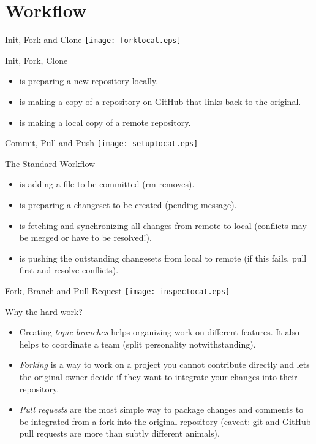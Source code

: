 \documentclass[style=husky,display=slides,clock]{powerdot}
\begin{document}
\section{Workflow}
\begin{slide}{Init, Fork and Clone}
	\texttt{[image: forktocat.eps]}
\end{slide}
\begin{note}{Init, Fork, Clone}
	\begin{itemize}
		\item[Init] is preparing a new repository locally.
		\item[Fork] is making a copy of a repository on GitHub that links back to the original.
		\item[Clone] is making a local copy of a remote repository.
	\end{itemize}
\end{note}
\begin{slide}{Commit, Pull and Push}
	\texttt{[image: setuptocat.eps]}
\end{slide}
\begin{note}{The Standard Workflow}
	\begin{itemize}
		\item[Add] is adding a file to be committed (rm removes).
		\item[Commit] is preparing a changeset to be created (pending message).
		\item[Pull] is fetching and synchronizing all changes from remote to local (conflicts may be merged or have
			to be resolved!).
		\item[Push] is pushing the outstanding changesets from local to remote (if this fails, pull first and
			resolve conflicts).
	\end{itemize}
\end{note}
\begin{slide}{Fork, Branch and Pull Request}
	\texttt{[image: inspectocat.eps]}
\end{slide}
\begin{note}{Why the hard work?}
	\begin{itemize}
		\item Creating \textit{topic branches} helps organizing work on different features. It also helps to
			coordinate a team (split personality notwithstanding).
		\item \textit{Forking} is a way to work on a project you cannot contribute directly and lets the original owner
			decide if they want to integrate your changes into their repository.
		\item \textit{Pull requests} are the most simple way to package changes and comments to be integrated from a fork into the
			original repository (caveat: git and GitHub pull requests are more than subtly different animals).
	\end{itemize}
\end{note}
\end{document}
